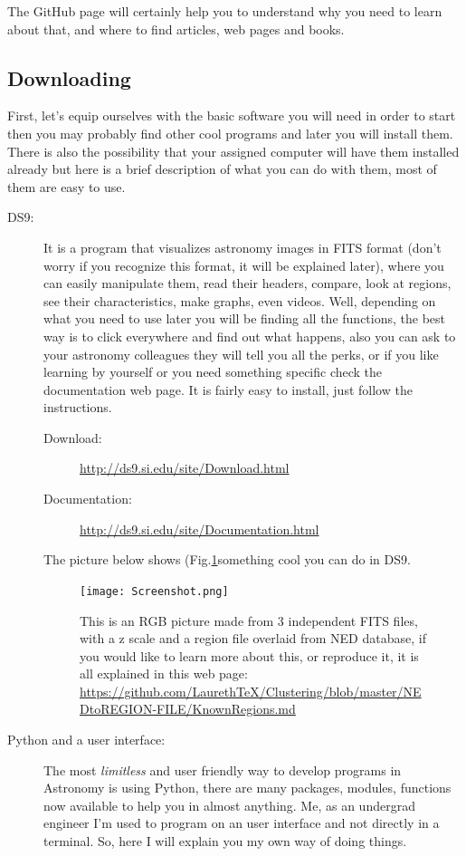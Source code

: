 \documentclass[11pt,fleqn]{book} %
\begin{document}
The GitHub page will certainly help you to understand why you need to learn about that, and where to find articles, web pages and books.
\subsection{Downloading}
First, let's equip ourselves with the basic software you will need in order to start then you may probably find other cool programs and later you will install them. There is also the possibility that your assigned computer will have them installed already but here is a brief description of what you can do with them, most of them are easy to use.

\begin{description}
	\item[DS9:] It is a program that visualizes astronomy images in FITS format (don't worry if you recognize this format, it will be explained later), where you can easily manipulate them, read their headers, compare, look at regions, see their characteristics, make graphs, even videos. Well, depending on what you need to use later you will be finding all the functions, the best way is to click everywhere and find out what happens, also you can ask to your astronomy colleagues they will tell you all the perks, or if you like learning by yourself or you need something specific check the documentation web page. It is fairly easy to install, just follow the instructions.
    	\begin{description}
        	\item[Download: ]\url{http://ds9.si.edu/site/Download.html}
            \item[Documentation: ]\url{http://ds9.si.edu/site/Documentation.html}
        \end{description}
        The picture below shows (Fig.\ref{fig:screen}something cool you can do in DS9.
        \begin{figure}[h]
        	\centering
    \texttt{[image: Screenshot.png]}
    \caption{This is an RGB picture made from 3 independent FITS files, with a z scale and a region file overlaid from NED database, if you would like to learn more about this, or reproduce it, it is all explained in this web page: \url{https://github.com/LaurethTeX/Clustering/blob/master/NEDtoREGION-FILE/KnownRegions.md}}
    \label{fig:screen}
        \end{figure}
        
    \item[Python and a user interface: ]The most \emph{limitless} and user friendly way to develop programs in Astronomy is using Python, there are many packages, modules, functions now available to help you in almost anything. Me, as an undergrad engineer I'm used to program on an user interface and not directly in a terminal. So, here I will explain you my own way of doing things.
    

\end{description}
\end{document}
